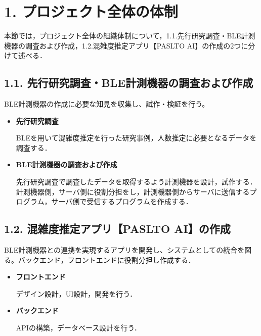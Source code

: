 \section*{1. プロジェクト全体の体制}
本節では，プロジェクト全体の組織体制について，1.1.先行研究調査・BLE計測機器の調査および作成，1.2.混雑度推定アプリ【PASLTO AI】の作成の2つに分けて述べる．

\subsection*{1.1. 先行研究調査・BLE計測機器の調査および作成}
BLE計測機器の作成に必要な知見を収集し、試作・検証を行う。
\begin{itemize}
	\item {\bfseries 先行研究調査}
	
	BLEを用いて混雑度推定を行った研究事例，人数推定に必要となるデータを調査する．
	\item {\bfseries BLE計測機器の調査および作成}
	
	先行研究調査で調査したデータを取得するよう計測機器を設計，試作する．
	計測機器側，サーバ側に役割分担をし，計測機器側からサーバに送信するプログラム，サーバ側で受信するプログラムを作成する．
\end{itemize}


\subsection*{1.2. 混雑度推定アプリ【PASLTO AI】の作成}
BLE計測機器との連携を実現するアプリを開発し、システムとしての統合を図る。バックエンド，フロントエンドに役割分担し作成する．
\begin{itemize}
	\item {\bfseries フロントエンド}
	
	デザイン設計，UI設計，開発を行う．
	\item {\bfseries バックエンド}
	
	APIの構築，データベース設計を行う．
\end{itemize}

